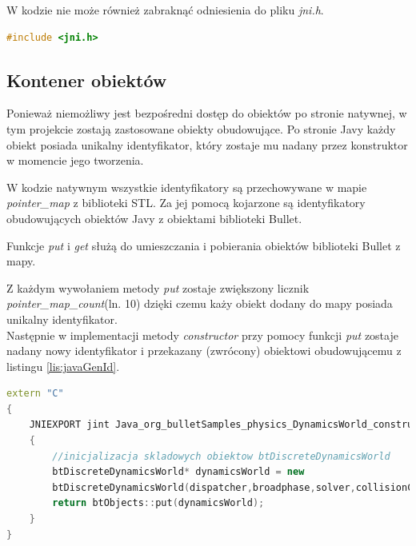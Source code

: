

W kodzie nie może również zabraknąć odniesienia do pliku \emph{jni.h}.

\begin{lstlisting}[language=c++, caption=Użycie pliku nagłówkowego]
#include <jni.h>
\end{lstlisting}

\subsection{Kontener obiektów}
Ponieważ niemożliwy jest bezpośredni dostęp do obiektów po stronie natywnej,
w tym projekcie zostają zastosowane obiekty obudowujące. Po stronie Javy każdy
obiekt posiada unikalny identyfikator, który zostaje mu nadany przez
konstruktor w momencie jego tworzenia.



W kodzie natywnym wszystkie identyfikatory są przechowywane w mapie
\emph{pointer\_map} z biblioteki STL. Za jej pomocą kojarzone są identyfikatory
obudowujących obiektów Javy z obiektami biblioteki Bullet.



Funkcje \emph{put} i \emph{get} służą do umieszczania i pobierania obiektów
biblioteki Bullet z mapy.



Z każdym wywołaniem metody \emph{put} zostaje zwiększony licznik
\emph{pointer\_map\_count}(ln. 10) dzięki czemu każy obiekt dodany do mapy
posiada unikalny identyfikator.\\
Następnie w implementacji metody \emph{constructor} przy
pomocy funkcji \emph{put} zostaje nadany nowy identyfikator i
przekazany (zwrócony) obiektowi obudowującemu z listingu \ref{lis:javaGenId}.

\begin{lstlisting}[language=c++, caption=Użycie mapy pointer\_map w
funkcji constructor.]
extern "C"
{
	JNIEXPORT jint Java_org_bulletSamples_physics_DynamicsWorld_constructor( JNIEnv* env, jobject self )
	{
		//inicjalizacja skladowych obiektow btDiscreteDynamicsWorld
		btDiscreteDynamicsWorld* dynamicsWorld = new
		btDiscreteDynamicsWorld(dispatcher,broadphase,solver,collisionConfiguration);
		return btObjects::put(dynamicsWorld);
	}
}
\end{lstlisting}

